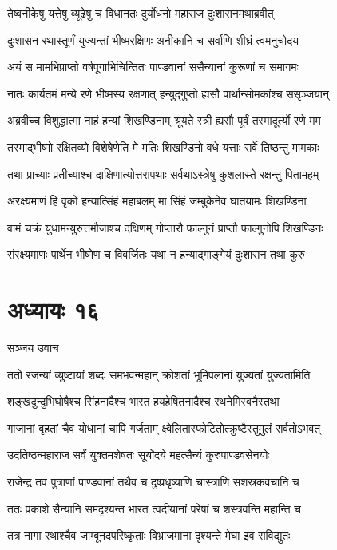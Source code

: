 \twolineshloka
{तेष्वनीकेषु यत्तेषु व्यूढेषु च विधानतः}
{दुर्योधनो महाराज दुःशासनमथाब्रवीत्}


\twolineshloka
{दुःशासन रथास्तूर्णं युज्यन्तां भीष्मरक्षिणः}
{अनीकानि च सर्वाणि शीघ्रं त्वमनुचोदय}


\twolineshloka
{अयं स मामभिप्राप्तो वर्षपूगाभिचिन्तितः}
{पाण्डवानां ससैन्यानां कुरूणां च समागमः}


\twolineshloka
{नातः कार्यतमं मन्ये रणे भीष्मस्य रक्षणात्}
{हन्युद्गुप्तो ह्यसौ पार्थान्सोमकांश्च ससृञ्जयान्}


\twolineshloka
{अब्रवीच्च विशुद्धात्मा नाहं हन्यां शिखण्डिनाम्}
{श्रूयते स्त्री ह्यसौ पूर्वं तस्मादूर्त्यो रणे मम}


\twolineshloka
{तस्माद्भीष्मो रक्षितव्यो विशेषेणेति मे मतिः}
{शिखण्डिनो वधे यत्ताः सर्वे तिष्ठन्तु मामकाः}


\twolineshloka
{तथा प्राच्याः प्रतीच्याश्च दाक्षिणात्योत्तरापथाः}
{सर्वथाऽस्त्रेषु कुशलास्ते रक्षन्तु पितामहम्}


\twolineshloka
{अरक्ष्यमाणं हि वृको हन्यात्सिंहं महाबलम्}
{मा सिंहं जम्बुकेनेव घातयामः शिखण्डिना}


\threelineshloka
{वामं चक्रं युधामन्युरुत्तमौजाश्च दक्षिणम्}
{गोप्तारौ फाल्गुनं प्राप्तौ फाल्गुनोपि शिखण्डिनः}
{}


\twolineshloka
{संरक्ष्यमाणः पार्थेन भीष्मेण च विवर्जितः}
{यथा न हन्याद्गाङ्गेयं दुःशासन तथा कुरु}


\chapter{अध्यायः १६}
\twolineshloka
{सञ्जय उवाच}
{}


\twolineshloka
{ततो रजन्यां व्युष्टायां शब्दः समभवन्महान्}
{क्रोशतां भूमिपलानां युज्यतां युज्यतामिति}


\twolineshloka
{शङ्खदुन्दुभिघोषैश्च सिंहनादैश्च भारत}
{हयहेषितनादैश्च रथनेमिस्वनैस्तथा}


\twolineshloka
{गाजानां बृहतां चैव योधानां चापि गर्जताम्}
{क्ष्वेलितास्फोटितोत्क्रुष्टैस्तुमुलं सर्वतोऽभवत्}


\twolineshloka
{उदतिष्ठन्महाराज सर्वं युक्तमशेषतः}
{सूर्योदये महत्सैन्यं कुरुपाण्डवसेनयोः}


\twolineshloka
{राजेन्द्र तव पुत्राणां पाण्डवानां तथैव च}
{दुष्प्रधृष्याणि चास्त्राणि सशस्रकवचानि च}


\twolineshloka
{ततः प्रकाशे सैन्यानि समदृश्यन्त भारत}
{त्वदीयानां परेषां च शस्त्रवन्ति महान्ति च}


\twolineshloka
{तत्र नागा रथाश्चैव जाम्बूनदपरिष्कृताः}
{विभ्राजमाना दृश्यन्ते मेघा इव सविद्युतः}


